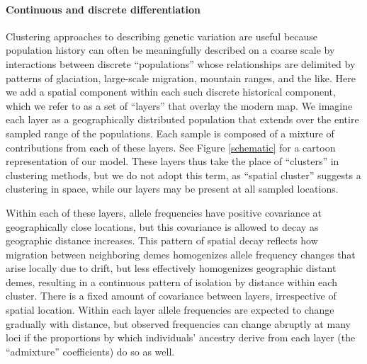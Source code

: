 \documentclass[12pt]{article}
\begin{document}
\paragraph{Continuous and discrete differentiation}
Clustering approaches to describing genetic variation
are useful because population history can often be meaningfully described on a coarse scale
by interactions between discrete ``populations''
whose relationships are delimited by patterns of glaciation,
large-scale migration,
mountain ranges, and the like.
Here we add a spatial component within each such discrete historical component,
which we refer to as a set of ``layers'' that overlay the modern map.
We imagine each layer as a geographically distributed population 
that extends over the entire sampled range of the populations. 
Each sample is composed of a mixture of contributions from each of
these layers. 
See Figure \ref{schematic} for a cartoon representation of our model. 
These layers thus take the place of ``clusters'' in clustering methods,
but we do not adopt this term, 
as ``spatial cluster'' suggests a clustering in space, 
while our layers may be present at all sampled locations.


Within each of these layers,
allele frequencies have positive covariance at geographically close locations,
but this covariance is allowed to decay as geographic distance increases.
This pattern of spatial decay reflects how migration between neighboring demes  
homogenizes allele frequency changes that arise locally due to drift, 
but less effectively homogenizes geographic distant demes,
resulting in a continuous pattern of isolation by distance within each cluster.
There is a fixed amount of covariance between layers, irrespective of spatial location.
Within each layer allele frequencies are expected to change gradually with distance,
but observed frequencies can change abruptly at many loci 
if the proportions by which individuals' ancestry derive from each layer 
(the ``admixture'' coefficients) 
do so as well. 
\end{document}
